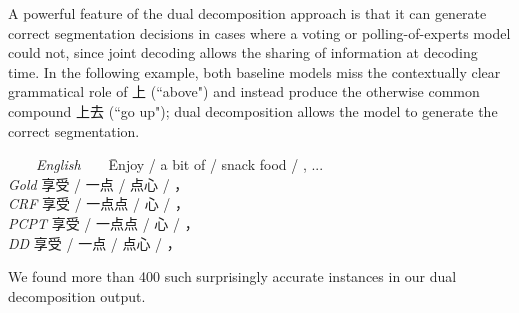 A powerful feature of the dual decomposition approach is that it can generate correct segmentation decisions in cases where a voting or polling-of-experts model could not, since joint decoding allows the sharing of information at decoding time. In the following example, both baseline models miss the contextually clear grammatical role of 上 (``above") and instead produce the otherwise common compound 上去 (``go up"); dual decomposition allows the model to generate the correct segmentation.
\begin{small}
\begin{tabbing}
\ \ \ \ \= \emph{English}\ \ \ \ \= Enjoy / a bit of / snack food / , ... \\
\> \emph{Gold} \>  享受 / 一点 / 点心 /  ，\\
\> \emph{CRF} \> 享受 / 一点点 / 心 / ，\\
\> \emph{PCPT} \> 享受 / 一点点 / 心 / ， \\
\> \emph{DD} \>  享受 / 一点 / 点心 / ，\\
\end{tabbing}
\end{small}
We found more than 400 such surprisingly accurate instances in our dual decomposition output.
%
%
%

